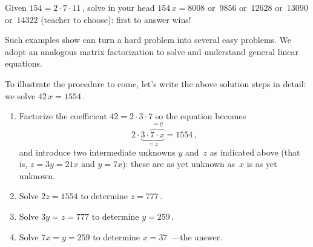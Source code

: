 \begin{activity} 
Given \(154=2\cdot7\cdot11\)\,, solve in your head \(154\,x=8008\) or~\(9856\) or~\(12628\) or~\(13090\) or~\(14322\) (teacher to choose): first to answer wins!
\end{activity}

Such examples show  can turn a hard problem into several easy problems.  
We adopt an analogous matrix factorization to solve and understand general linear equations.  

To illustrate the procedure to come, let's write the above solution steps in detail: we solve \(42\,x=1554\)\,.
\begin{enumerate}
\item Factorize the coefficient \(42=2\cdot3\cdot7\) so the equation becomes  
\begin{equation*}
2\cdot\underbrace{3\cdot\overbrace{7\cdot x}^{=y}}_{=z}=1554\,,
\end{equation*}
and introduce two intermediate unknowns \(y\) and~\(z\) as indicated above (that is, \(z=3y=21x\) and \(y=7x\)): these are as yet unknown as~\(x\) is as yet unknown.
\item Solve \(2z=1554\) to determine \(z=777\)\,.
\item Solve \(3y=z=777\) to determine \(y=259\)\,.
\item Solve \(7x=y=259\) to determine \(x=37\)\ ---the answer.
\end{enumerate}

